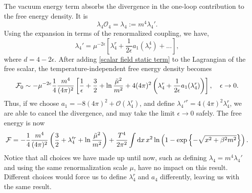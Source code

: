 The vacuum energy term absorbs the divergence in the one-loop contribution to the free energy density.
It is
%
\begin{equation}
    \label{scalar field static term}
    \lambda_4 \mathcal{O}_4 = \lambda_4 := m^4 \lambda_4'.
\end{equation}
%
Using the expansion in terms of the renormalized coupling, we have, 
%
\begin{equation}
    \lambda_4' = \mu^{- 2 \epsilon}\left[ \lambda_4^r + \frac{1}{2 \epsilon} a_1(\lambda_r^4) + ... \right],
\end{equation}
%
where $d = 4 - 2\epsilon$.
After adding \autoref{scalar field static term} to the Lagrangian of the free scalar, the temperature-independent free energy density becomes
%
\begin{equation}
    \mathcal{F}_0 \sim - \mu^{-2 \epsilon}  \frac{1}{4} \frac{m^4}{(4 \pi)^2}  
    \left[
        \frac{1}{\epsilon} + \frac{3}{2} + \ln{\frac{\tilde \mu^2}{m^2}}
        + 4 (4 \pi)^2 \left(\lambda_4^r + \frac{1}{2\epsilon} a_1(\lambda_4^r)\right)
    \right],
    \quad \epsilon \rightarrow 0.
\end{equation}
%
Thus, if we choose $a_1 = -8 (4\pi)^2 + \mathcal{O}(\lambda_4^r)$, and define $\lambda_4'^r = 4(4\pi)^2\lambda_4^r$, we are able to cancel the divergence, and may take the limit $\epsilon \rightarrow 0$ safely.
The free energy is now
%
\begin{equation}
    \mathcal{F} = -\frac{1}{4} \frac{m^4}{(4 \pi)^2} 
    \left(
        \frac{3}{2} + \lambda_4'^r + \ln \frac{\tilde \mu^2}{m^2}
    \right)
    +
    \frac{T^4}{2\pi^2} \int \text{d} x \, x^2 \ln\left(1 - \text{exp} \left\{ -\sqrt{x^2 + \beta^2 m^2} \right\}\right).
\end{equation}
%
Notice that all choices we have made up until now, such as defining $\lambda_4 = m^4 \lambda_4'$ and using the same renormalization scale $\mu$, have no impact on this result.
Different choices would force us to define $\lambda_4^r$ and $a_4$ differently, leaving us with the same result.

